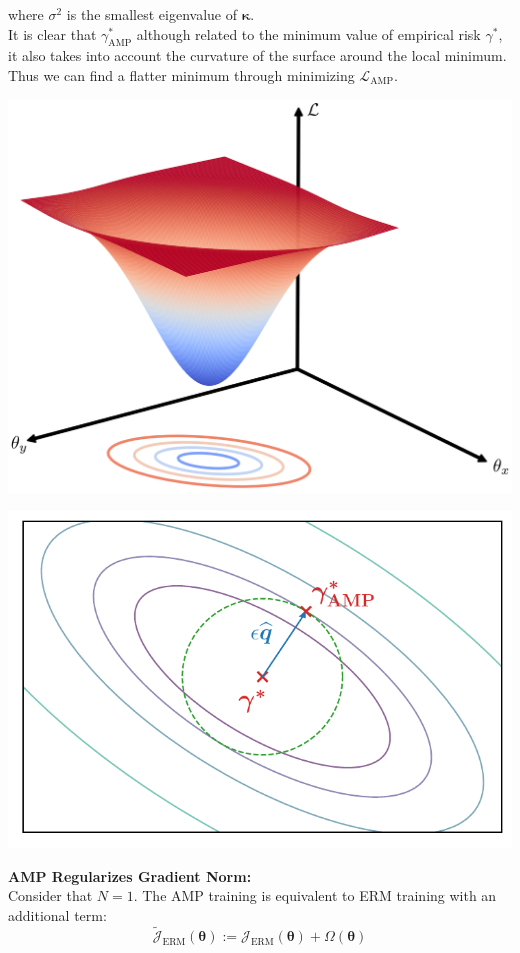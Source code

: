 \documentclass[landscape,a0paper,fontscale=0.3]{baposter}
\begin{document}
\begin{poster}
{\noindent where $\sigma^2$ is the smallest eigenvalue of $\boldsymbol{\kappa}$.\\
It is clear that $\gamma^\ast_\mathrm{AMP}$ although related to the minimum value of empirical risk $\gamma^\ast$, it also takes into account the curvature of the surface around the local minimum. Thus we can find a flatter minimum through minimizing $\mathcal{L}_\mathrm{AMP}$.\\
\begin{minipage}{0.99\linewidth}
\centering
\begin{minipage}{0.4\linewidth}
\centering
\includegraphics[width=.8\linewidth]{figs/surface.png}
\end{minipage}
\begin{minipage}{0.4\linewidth}
\centering
\includegraphics[width=.8\linewidth]{figs/gaussian.pdf}
\end{minipage}
\end{minipage}

\textbf{\color{blue}AMP Regularizes Gradient Norm:}\\
Consider that $N=1$. The AMP training is equivalent to ERM training with an additional term:
\vspace{-0.6em}
\begin{equation*}
\widetilde{\mathcal{J}}_\mathrm{ERM}(\boldsymbol{\theta}):=\mathcal{J}_\mathrm{ERM}(\boldsymbol{\theta})+\Omega(\boldsymbol{\theta})
\end{equation*}
\vspace{-2.2em}

}
\end{poster}
\end{document}

